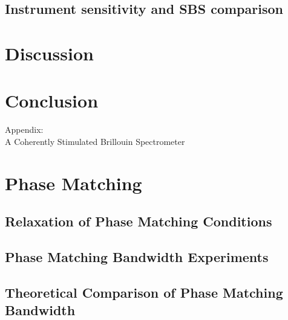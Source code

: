 \documentclass[%
  reprint,
  superscriptaddress,
  amsmath,amssymb,
  aps,
  prapplied,
]{revtex4-2}
\begin{document}
\subsection*{Instrument sensitivity and SBS comparison}

\lipsum[1-3]


\section{Discussion}\label{Discussion}

\lipsum[1-2]


\section{Conclusion}\label{Conclusion}

\lipsum[1]


\begin{acknowledgments}

\end{acknowledgments}

\clearpage %
\onecolumngrid %

\begin{titlepage}
\centering
{}
{\Large Appendix:\\[10pt] A Coherently Stimulated Brillouin Spectrometer\par}
\end{titlepage}

\clearpage
\onecolumngrid

\appendix

\section{Phase Matching}
\subsection{Relaxation of Phase Matching Conditions}
\subsection{Phase Matching Bandwidth Experiments}
\subsection{Theoretical Comparison of Phase Matching Bandwidth}
\end{document}
